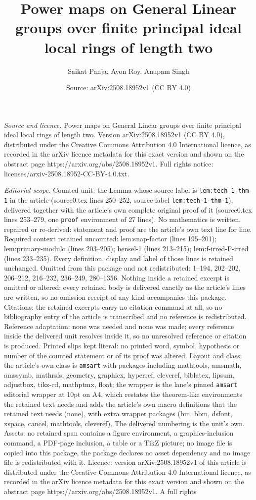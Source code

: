 \documentclass[10pt,a4paper]{amsart}
\title[Power maps on General Linear groups over finite principal id]{Power maps on General Linear groups over finite principal ideal local rings of length two}
\author{Saikat Panja, Ayon Roy, Anupam Singh}
\date{Source: arXiv:2508.18952v1 (CC BY 4.0)}
\begin{document}
\maketitle

\noindent\emph{Source and licence.} Power maps on General Linear groups over finite principal ideal local rings of length two. Version arXiv:2508.18952v1 (CC BY 4.0), distributed under the Creative Commons Attribution 4.0 International licence, as recorded in the arXiv licence metadata for this exact version and shown on the abstract page https://arxiv.org/abs/2508.18952v1. Full rights notice: licenses/arxiv-2508.18952-CC-BY-4.0.txt.\par\smallskip

\noindent\textit{Editorial scope.} Counted unit: the Lemma whose source label is \texttt{lem:tech-1-thm-1} in the article (source0.tex lines 250--252, source label \texttt{lem:tech-1-thm-1}), delivered together with the article's own complete original proof of it (source0.tex lines 253--279, one \texttt{proof} environment of 27 lines). No mathematics is written, repaired or re-derived: statement and proof are the article's own text line for line. Required context retained uncounted: lem:snap-factor (lines 195--201); lem:primary-modulo (lines 203--205); hensel-1 (lines 213--215); lem:f-irred-F-irred (lines 233--235). Every definition, display and label of those lines is retained unchanged. Omitted from this package and not redistributed: 1--194, 202--202, 206--212, 216--232, 236--249, 280--1356. Nothing inside a retained excerpt is omitted or altered: every retained body is delivered exactly as the article's lines are written, so no omission receipt of any kind accompanies this package. Citations: the retained excerpts carry no citation command at all, so no bibliography entry of the article is transcribed and no reference is redistributed. Reference adaptation: none was needed and none was made; every reference inside the delivered unit resolves inside it, so no unresolved reference or citation is produced. Printed slips kept literal: no printed word, symbol, hypothesis or number of the counted statement or of its proof was altered. Layout and class: the article's own class is \texttt{amsart} with packages including mathtools, amsmath, amssymb, mathrsfs, geometry, graphicx, hyperref, cleveref, biblatex, lipsum, adjustbox, tikz-cd, mathptmx, float; the wrapper is the lane's pinned \texttt{amsart} editorial wrapper at 10pt on A4, which restates the theorem-like environments the retained text needs and adds the article's own macro definitions that the retained text needs (none), with extra wrapper packages (bm, bbm, dsfont, xspace, cancel, mathtools, cleveref). The delivered numbering is the unit's own. Assets: no retained span contains a figure environment, a graphics-inclusion command, a PDF-page inclusion, a table or a TikZ picture; no image file is copied into this package, the package declares no asset dependency and no image file is redistributed with it. Licence: version arXiv:2508.18952v1 of this article is distributed under the Creative Commons Attribution 4.0 International licence, as recorded in the arXiv licence metadata for this exact version and shown on the abstract page https://arxiv.org/abs/2508.18952v1. A full rights 
\end{document}
